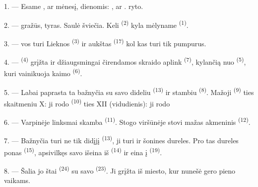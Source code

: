 \VUsaut{2.4mm}

\VUsaut{3.0mm}

1. --- Esame  ,  ar 
mėnesį,  dienomis: ,  ar
.  ryto.

2. ---  gražūs,  tyras. Saulė šviečia. Keli
 \textsuperscript{(2)} kyla mėlyname 
\textsuperscript{(1)}.

3. ---  vos turi  Lieknos 
\textsuperscript{(3)} ir aukštas  \textsuperscript{(17)} kol kas turi
tik pumpurus.

4. ---  \textsuperscript{(4)} grįžta ir džiaugsmingai čirendamos
skraido aplink  \textsuperscript{(7)}, kylančią nuo
 \textsuperscript{(5)}, kuri vainikuoja kaimo 
\textsuperscript{(6)}.

\VUsaut{3.4mm}
\VUsaut{3.0mm}

5. --- Labai paprasta ta bažnyčia su savo dideliu 
\textsuperscript{(13)} ir stambiu  \textsuperscript{(8)}. Mažoji
 \textsuperscript{(9)} ties skaitmeniu X: ji rodo 
 \textsuperscript{(10)} ties XII (vidudienis): ji rodo

6. --- Varpinėje linksmai skamba  \textsuperscript{(11)}. Stogo
viršūnėje stovi mažas akmeninis  \textsuperscript{(12)}.

7. --- Bažnyčia turi ne tik didįjį  \textsuperscript{(13)}, ji turi
ir šonines dureles. Pro tas dureles ponas  \textsuperscript{(15)},
apsivilkęs savo  išeina iš 
\textsuperscript{(14)} ir eina į  \textsuperscript{(19)}.

8. --- Šalia jo štai  \textsuperscript{(24)} su savo
 \textsuperscript{(23)}. Ji grįžta iš miesto, kur nunešė gero pieno
vaikams.

\VUsaut{4.0mm}
\VUsaut{3.4mm}

